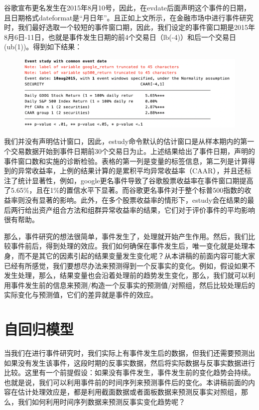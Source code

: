\documentclass[cn,12pt,math=newtx,citestyle=gb7714-2015,bibstyle=gb7714-2015]{elegantbook}
\begin{document}
	谷歌宣布更名发生在2015年8月10号，因此，在evdate后面声明这个事件的日期，且日期格式dateformat是“月日年”。且正如上文所示，在金融市场中进行事件研究时，我们最好选取一个较短的事件窗口期，因此，我们设定的事件窗口期是2015年8月6日-11日，也就是事件发生日期的前4个交易日（lb(-4)）和后一个交易日(ub(1))。得到如下结果：

\begin{figure}[tbph]
	\centering
	\includegraphics[width=1\linewidth, height=0.5\textheight]{estudy_result}
	\caption{}
	\label{fig:estudy_result}
\end{figure}

    我们并没有声明估计窗口，因此，estudy命令默认的估计窗口是从样本期内的第一个交易数据开始到事件日期前30个交易日为止。上述结果给出了事件日期，声明的事件窗口数和实施的诊断检验。表格的第一列是变量的标签信息，第二列是计算得到的异常收益率，上例的结果计算的是累积平均异常收益率（CAAR），并且还标注了统计显著性，例如，google更名事件导致了谷歌股票收益率在事件窗口期提高了5.65\%，且在1\%的置信水平下显著。而谷歌更名事件对于整个标普500指数的收益率则没有显著的影响。此外，在多个股票收益率的情形下，estudy会在结果的最后两行给出资产组合方法和组群异常收益率的结果，它们对于评价事件的平均影响很有帮助。

    那么，事件研究的想法很简单，事件发生了，处理就开始产生作用。然后，我们比较事件前后，得到处理的效应。我们如何确保在事件发生后，唯一变化就是处理本身，而不是其它的因素引起的结果变量发生变化呢？从本讲稿的前面内容可能大家已经有所感觉，我们要想尽办法来预测得到一个反事实的变化。例如，假设如果不发生处理，那么，结果变量也会沿着处理前的趋势发生变化，那么，我们就可以利用事件发生前的信息来预测/构造一个反事实的预测值/对照组，然后比较处理后的实际变化与预测值，它们的差异就是事件的效应。
	
	\section{自回归模型}
	
    当我们在进行事件研究时，我们实际上有事件发生后的数据，但我们还需要预测出如果没有发生该事件，这段时期的反事实数据，然后将实际数据与反事实数据进行比较。这里有一个前提假设：如果没有事件发生，事件发生前的变化趋势会持续。也就是说，我们可以利用事件前的时间序列来预测事件后的变化。本讲稿前面的内容在估计处理效应是，都是利用截面数据或者面板数据来预测反事实对照组，那么，我们如何利用时间序列数据来预测反事实变化趋势呢？
    
\end{document}
